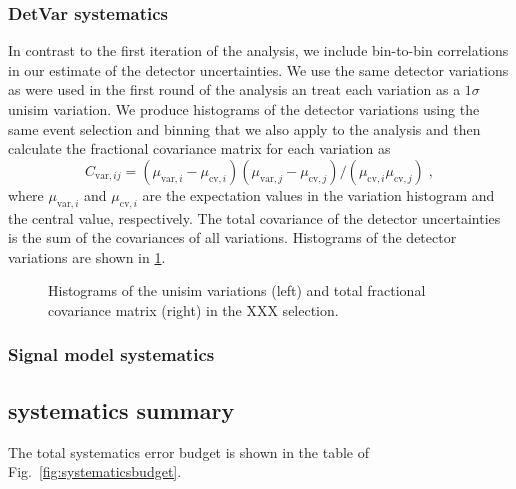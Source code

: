\subsubsection{DetVar systematics}
In contrast to the first iteration of the analysis, we include bin-to-bin correlations in our estimate of the detector uncertainties. We use the same detector variations as were used in the first round of the analysis an treat each variation as a $1\sigma$ unisim variation. We produce histograms of the detector variations using the same event selection and binning that we also apply to the analysis and then calculate the fractional covariance matrix for each variation as 
\begin{equation}
    C_{\text{var}, ij} = (\mu_{\text{var},i} - \mu_{\text{cv},i})(\mu_{\text{var},j} - \mu_{\text{cv},j})/(\mu_{\text{cv},i}\mu_{\text{cv},j})\;,
\end{equation}
where $\mu_{\text{var},i}$ and $\mu_{\text{cv},i}$ are the expectation values in the variation histogram and the central value, respectively. The total covariance of the detector uncertainties is the sum of the covariances of all variations. Histograms of the detector variations are shown in \cref{fig:unisim-covariance}.
\begin{figure}
    \begin{subfigure}{0.45\textwidth}
    \end{subfigure}
    \begin{subfigure}{0.45\textwidth}
    \end{subfigure}
    \caption{Histograms of the unisim variations (left) and total fractional covariance matrix (right) in the XXX selection.}
    \label{fig:unisim-covariance}
\end{figure}
\subsubsection{Signal model systematics}

\subsection{systematics summary}

The total systematics error budget is shown in the table of Fig.~\ref{fig:systematicsbudget}.

